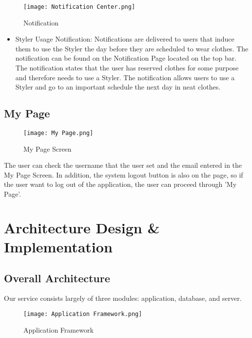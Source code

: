 \documentclass[conference]{IEEEtran}
\begin{document}
\begin{figure}[htbp]
\centerline{\texttt{[image: Notification Center.png]}}
\label{fig}
\caption{Notification}
\end{figure}
\begin{itemize}
    \item Styler Usage Notification: Notifications are delivered to users that induce them to use the Styler the day before they are scheduled to wear clothes. The notification can be found on the Notification Page located on the top bar. The notification states that the user has reserved clothes for some purpose and therefore needs to use a Styler. The notification allows users to use a Styler and go to an important schedule the next day in neat clothes.\\
\end{itemize}

\subsection{My Page}
\begin{figure}[htbp]
\centerline{\texttt{[image: My Page.png]}}
\label{fig}
\caption{My Page Screen}
\end{figure}
The user can check the username that the user set and the email entered in the My Page Screen. In addition, the system logout button is also on the page, so if the user want to log out of the application, the user can proceed through 'My Page'.\\


\section{Architecture Design & Implementation}
\subsection{Overall Architecture}
Our service consists largely of three modules: application, database, and server.
\begin{figure}[htbp]
\centerline{\texttt{[image: Application Framework.png]}}
\label{fig}
\caption{Application Framework}
\end{figure}
\end{document}
